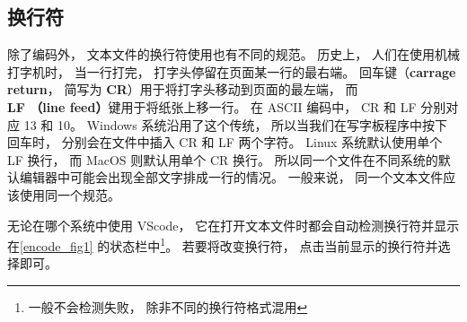 \subsection{换行符}
除了编码外， 文本文件的换行符使用也有不同的规范。 历史上， 人们在使用机械打字机时， 当一行打完， 打字头停留在页面某一行的最右端。 回车键（\textbf{carrage return}， 简写为 \textbf{CR}）用于将打字头移动到页面的最左端， 而 \textbf{LF （line feed）}键用于将纸张上移一行。 在 ASCII 编码中， CR 和 LF 分别对应 13 和 10。 Windows 系统沿用了这个传统， 所以当我们在写字板程序中按下回车时， 分别会在文件中插入 CR 和 LF 两个字符。 Linux 系统默认使用单个 LF 换行， 而 MacOS 则默认用单个 CR 换行。 所以同一个文件在不同系统的默认编辑器中可能会出现全部文字排成一行的情况。 一般来说， 同一个文本文件应该使用同一个规范。

无论在哪个系统中使用 VScode， 它在打开文本文件时都会自动检测换行符并显示在\autoref{encode_fig1} 的状态栏中\footnote{一般不会检测失败， 除非不同的换行符格式混用}。 若要将改变换行符， 点击当前显示的换行符并选择即可。

